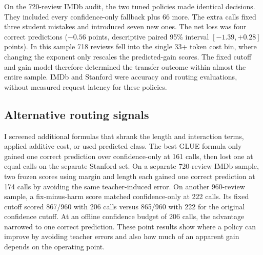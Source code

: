 On the 720-review IMDb audit, the two tuned policies made identical decisions. They included every confidence-only fallback plus 66 more. The extra calls fixed three student mistakes and introduced seven new ones. The net loss was four correct predictions (\(-0.56\) points, descriptive paired 95\% interval \([-1.39,+0.28]\) points). In this sample 718 reviews fell into the single 33+ token cost bin, where changing the exponent only rescales the predicted-gain scores. The fixed cutoff and gain model therefore determined the transfer outcome within almost the entire sample. IMDb and Stanford were accuracy and routing evaluations, without measured request latency for these policies.

\subsection{Alternative routing signals}
I screened additional formulas that shrank the length and interaction terms, applied additive cost, or used predicted class. The best GLUE formula only gained one correct prediction over confidence-only at 161 calls, then lost one at equal calls on the separate Stanford set. On a separate 720-review IMDb sample, two frozen scores using margin and length each gained one correct prediction at 174 calls by avoiding the same teacher-induced error. On another 960-review sample, a fix-minus-harm score matched confidence-only at 222 calls. Its fixed cutoff scored 867/960 with 206 calls versus 865/960 with 222 for the original confidence cutoff. At an offline confidence budget of 206 calls, the advantage narrowed to one correct prediction. These point results show where a policy can improve by avoiding teacher errors and also how much of an apparent gain depends on the operating point.
